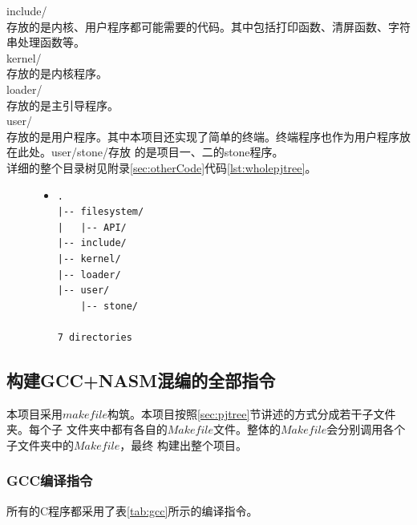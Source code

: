 \documentclass[a4paper]{article}
\begin{document}
    include/\\
    存放的是内核、用户程序都可能需要的代码。其中包括打印函数、清屏函数、字符串处理函数等。\\
    
    kernel/\\
    存放的是内核程序。\\
    
    loader/\\
    存放的是主引导程序。\\
    
    user/\\
    存放的是用户程序。其中本项目还实现了简单的终端。终端程序也作为用户程序放在此处。user/stone/存放
    的是项目一、二的stone程序。\\
    
    详细的整个目录树见附录\ref{sec:otherCode}代码\ref{lst:wholepjtree}。
    \begin{figure}
    \begin{itemize}
    \item[] \begin{lstlisting}[label=lst:pjtree, caption=项目目录树介绍(仅文件夹)]
.
|-- filesystem/
|   |-- API/
|-- include/
|-- kernel/
|-- loader/
|-- user/
    |-- stone/

7 directories
    \end{lstlisting}
    \end{itemize}
    \end{figure}
    \subsection{构建GCC+NASM混编的全部指令}
    本项目采用$makefile$构筑。本项目按照\ref{sec:pjtree}节讲述的方式分成若干子文件夹。每个子
    文件夹中都有各自的$Makefile$文件。整体的$Makefile$会分别调用各个子文件夹中的$Makefile$，最终
    构建出整个项目。
    \subsubsection{GCC编译指令}
    所有的C程序都采用了表\ref{tab:gcc}所示的编译指令。
\end{document}
